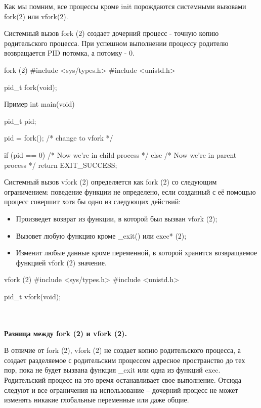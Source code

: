 Как мы помним, все процессы кроме init порождаются системными вызовами fork(2) или vfork(2). 

Системный вызов fork (2) создает дочерний процесс - точную копию родительского процесса. При успешном выполнении процессу родителю возвращается PID потомка, а потомку - 0.

\begin{CCode}{fork (2)}
	#include <sys/types.h>
	#include <unistd.h>
	
	pid_t fork(void); \end{CCode}

\begin{CCode}{Пример}
	int main(void) {
		pid_t pid;

		pid = fork(); /* change to vfork */
	
	    if (pid == 0) {
	        /* Now we're in child process */
		}   
		else {
			/* Now we're in parent process */
		}
		return EXIT_SUCCESS; 
	} \end{CCode}


Системный вызов vfork (2) определяется как fork (2) со следующим ограничением: поведение функции не определено, если созданный с её помощью процесс совершит хотя бы одно из следующих действий:

\begin{itemize}
	\item Произведет возврат из функции, в которой был вызван vfork (2);
	\item Вызовет любую функцию кроме \_exit() или exec* (2);
	\item Изменит любые данные кроме переменной, в которой хранится возвращаемое функцией vfork (2) значение.
\end{itemize}

\begin{CCode}{vfork (2)}
	#include <sys/types.h>
	#include <unistd.h>

	pid_t vfork(void); \end{CCode}

\\\\
\textbf{Разница между fork (2) и vfork (2).}

В отличие от fork (2), vfork (2) не создает копию родительского процесса, а создает разделяемое с родительским процессом адресное пространство до тех пор, пока не будет вызвана функция \_exit или одна из функций exec.
Родительский процесс на это время останавливает свое выполнение. Отсюда следуют и все ограничения на использование – дочерний процесс не может изменять никакие глобальные переменные или даже общие.

